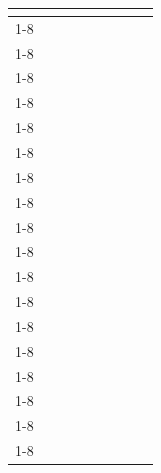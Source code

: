 \documentclass[a4paper,12pt]{article}
\newcommand{\xmark}{\color{red}\ding{53}}%
\newcommand{\cmark}{\color{green}\ding{51}}%
\begin{document}
\begin{figure}[H]
\begin{table}[H]
\begin{tabularx}{\textwidth}{| @{} c | c | c | c | c | c | c | c | c |}
    \cite{BD44}         & \cmark & \cmark & \cmark  &  \xmark & \cmark  & \xmark & \cmark  \\        \cline{1-8}
    \cite{BD05}         & \xmark & \cmark & \cmark  & \cmark  & \cmark  & \cmark  & \cmark  \\        \cline{1-8}
    \cite{BD47}        & \xmark & \cmark & \cmark & \xmark &  \cmark & \xmark & \cmark \\        \cline{1-8}
    \cite{BD32}        & \xmark & \xmark &  \xmark&\xmark  &\xmark  &  \xmark& \xmark  \\        \cline{1-8}
    \cite{BD45}        & \xmark &  &  & \xmark & \cmark & \xmark  & \xmark \\        \cline{1-8}
    \cite{BD36}        &  & \cmark & \cmark  & \xmark & \cmark  &  & \xmark \\        \cline{1-8}
    \cite{BD43}        & \cmark & \cmark  & \cmark & \xmark & \cmark & \xmark & \xmark \\        \cline{1-8}
    \cite{BD20}        & \cmark & \cmark & \cmark & \xmark & \xmark & \cmark & \xmark \\        \cline{1-8}
    \cite{BD04}        &\xmark & \cmark & \cmark & \cmark & \cmark & \cmark & \cmark \\        \cline{1-8}
    \cite{BD08}        & \xmark & \cmark & \cmark & \xmark & \xmark & \cmark & \xmark \\        \cline{1-8}
    \cite{BD13}        &\xmark & \cmark & \cmark & \cmark & \xmark & \xmark & \cmark \\        \cline{1-8}
    \cite{BD30}        & \xmark & \cmark & \cmark & \xmark & \cmark & \cmark &  \cmark\\        \cline{1-8}
    \cite{BD23}        & \xmark & \cmark & \cmark & \xmark &\xmark  & \xmark & \cmark \\        \cline{1-8}
    \cite{BD12}        & \xmark & \xmark & \xmark & \cmark & \xmark & \xmark & \cmark \\        \cline{1-8}
    \cite{BD26}      & \xmark & \cmark & \cmark & \cmark & \xmark & \xmark & \cmark \\        \cline{1-8}
    \cite{BD10}        &\xmark & \xmark & \xmark & \cmark & \xmark & \xmark & \cmark \\        \cline{1-8}
    \cite{BD11}        & \xmark & \cmark & \cmark & \xmark & \xmark & \cmark & \cmark \\        \cline{1-8}
    \cite{BD16}        &\xmark &\cmark &\cmark  & \xmark & \xmark & \xmark & \xmark \\        \cline{1-8}

\end{tabularx}
\end{table}
\end{figure}
\end{document}

